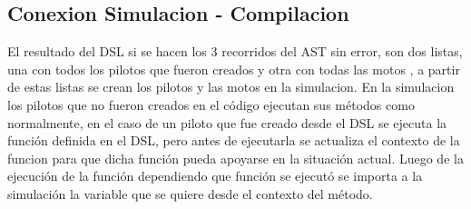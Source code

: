 	\subsection{Conexion Simulacion - Compilacion}
	
	El resultado del DSL si se hacen los 3 recorridos del AST sin error, son dos listas, una con todos los pilotos que fueron creados y otra con todas las motos , a partir de estas listas se crean los pilotos y las motos en la simulacion. En la simulacion los pilotos que no fueron creados en el código ejecutan sus métodos como normalmente, en el caso de un piloto que fue creado desde el DSL se ejecuta la función definida en el DSL, pero antes de ejecutarla se actualiza el contexto de la funcion para que dicha función pueda apoyarse en la situación actual. Luego de la ejecución de la función dependiendo que función se ejecutó se importa a la simulación la variable que se quiere desde el contexto del método. 		
		